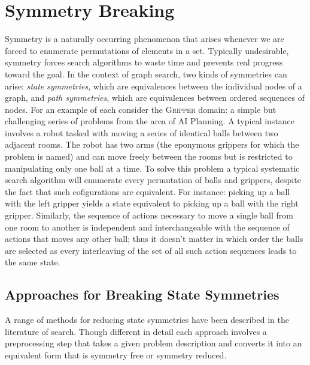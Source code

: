 \section{Symmetry Breaking}
\label{cha::lit::symmetry}
Symmetry is a naturally occurring phenomenon that arises whenever we are forced
to enumerate permutations of elements in a set. Typically
undesirable, symmetry forces search algorithms to waste time and prevents real 
progress toward the goal.
In the context of graph search, two kinds of symmetries can arise: \emph{state
symmetries}, which are equivalences between the individual nodes of a graph,
and \emph{path symmetries}, which are equivalences between ordered sequences of
nodes.
For an example of each consider the \textsc{Gripper} domain: a simple
but challenging series of problems from the area of AI Planning. A typical instance
involves a robot tasked with moving a series of identical balls between two adjacent rooms.
The robot has two arms (the eponymous grippers for which the problem is named) and can
move freely between the rooms but is restricted to manipulating only one
ball at a time.
To solve this problem a typical systematic search algorithm will enumerate every 
permutation of balls and grippers, despite the fact that such cofigurations are equivalent.
For instance: picking up a ball with the left gripper yields a state equivalent to 
picking up a ball with the right gripper.
 Similarly, the sequence of actions necessary to move a single ball from one room to another
is independent and interchangeable with the sequence of actions that moves any other ball;
thus it doesn't matter in which order the balls are selected as every interleaving of the set
of all such action sequences leads to the same state.

\subsection{Approaches for Breaking State Symmetries}
\label{cha::lit::symmetry::state}
A range of methods for reducing state symmetries have been described in the literature of 
search. Though different in detail each approach involves a preprocessing step that takes a given
problem description and converts it into an equivalent form that is symmetry free or symmetry 
reduced.

